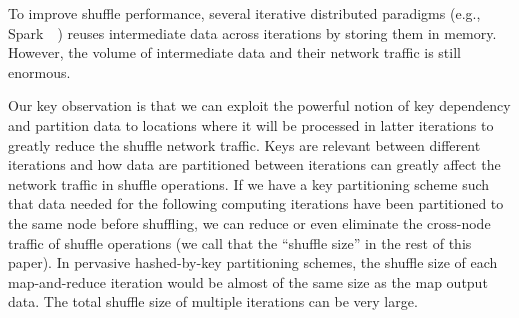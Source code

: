 \documentclass[10pt,journal,compsoc]{IEEEtran}
\newcommand{\blue}[1]{\textcolor{blue}{#1}}
\begin{document}
To improve shuffle performance,  
several iterative distributed paradigms (e.g., Spark~~\cite{zaharia2012resilient}) 
reuses intermediate data across iterations by storing them in memory.
However, the volume of intermediate data and their network traffic is still enormous.  

Our key observation is that we can exploit the powerful notion of key dependency
and partition data to locations where it will be processed in latter iterations to greatly reduce 
the shuffle network traffic.
Keys are relevant between different iterations 
and how data are partitioned between iterations
can greatly affect the network traffic in shuffle operations.
If we have a key partitioning scheme such that data needed for the
following computing iterations have been partitioned to the same 
node before shuffling, we can reduce or even eliminate
the cross-node traffic of shuffle operations (we call that the
``shuffle size'' in the rest of this paper). 
In pervasive hashed-by-key partitioning schemes, the shuffle size of
each map-and-reduce iteration would be almost of the same size as the
map output data. The total shuffle size of multiple iterations
can be very large.
\end{document}
